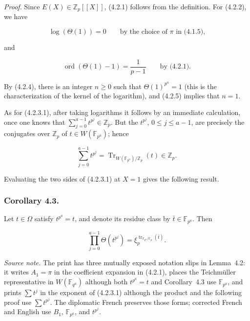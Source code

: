 \medskip
\noindent\emph{Proof.}
Since $E(X)\in\mathbb Z_p[[X]]$, (4.2.1) follows from the definition. For
(4.2.2), we have

\begin{equation}\tag{4.2.4}
\log(\Theta(1))=0
\qquad\text{by the choice of $\pi$ in (4.1.5),}
\end{equation}

and

\begin{equation}\tag{4.2.5}
\operatorname{ord}(\Theta(1)-1)=\frac1{p-1}
\qquad\text{by (4.2.1).}
\end{equation}

By (4.2.4), there is an integer $n\geq0$ such that
$\Theta(1)^{p^n}=1$ (this is the characterization of the kernel of the
logarithm), and (4.2.5) implies that $n=1$.

As for (4.2.3.1), after taking logarithms it follows by an immediate
calculation, once one knows that
$\sum_{j=0}^{a-1}t^{p^j}\in\mathbb Z_p$. But the $t^{p^j}$,
$0\leq j\leq a-1$, are precisely the conjugates over $\mathbb Z_p$ of
$t\in W(\mathbb F_{p^a})$; hence

\[
\sum_{j=0}^{a-1}t^{p^j}
=\operatorname{Tr}_{W(\mathbb F_{p^a})/\mathbb Z_p}(t)\in\mathbb Z_p.
\]

Evaluating the two sides of (4.2.3.1) at $X=1$ gives the following result.

\subsubsection*{Corollary 4.3.}
Let $t\in\Omega$ satisfy $t^{p^a}=t$, and denote its residue class by
$\bar t\in\mathbb F_{p^a}$. Then

\begin{equation}\tag{4.3.1}
\prod_{j=0}^{a-1}\Theta(t^{p^j})
=\xi_p^{\operatorname{tr}_{\mathbb F_{p^a}/\mathbb F_p}(\bar t)}.
\end{equation}

\medskip
\noindent\emph{Source note.}
The print has three mutually exposed notation slips in Lemma~4.2: it writes
$A_1=\pi$ in the coefficient expansion in (4.2.1), places the Teichmüller
representative in $W(\mathbb F_{q^a})$ although both $t^{p^a}=t$ and
Corollary~4.3 use $\mathbb F_{p^a}$, and prints $\sum t^j$ in the exponent
of (4.2.3.1) although the product and the following proof use
$\sum t^{p^j}$. The diplomatic French preserves those forms; corrected
French and English use $B_1$, $\mathbb F_{p^a}$, and $t^{p^j}$.
